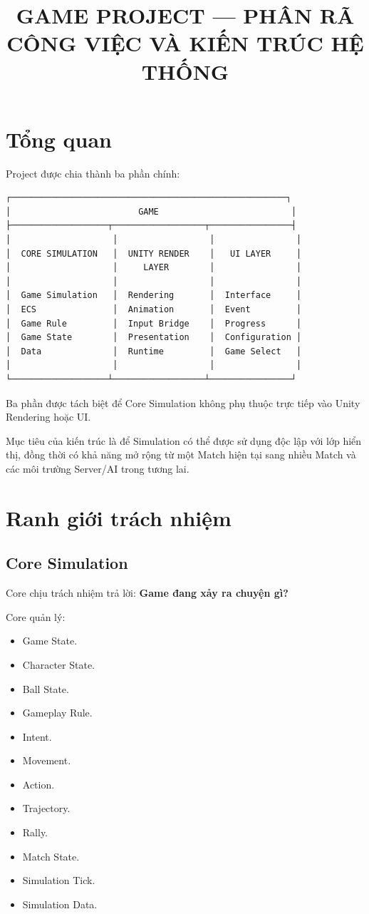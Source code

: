 \documentclass[12pt,a4paper]{article}
\title{\bfseries GAME PROJECT --- PHÂN RÃ CÔNG VIỆC VÀ KIẾN TRÚC HỆ THỐNG}
\author{}
\date{}
\begin{document}
\maketitle
\tableofcontents
\newpage

\section{Tổng quan}

Project được chia thành ba phần chính:

\begin{verbatim}
┌──────────────────────────────────────────────────────┐
│                         GAME                          │
├───────────────────┬──────────────────┬────────────────┤
│                    │                  │                │
│  CORE SIMULATION   │  UNITY RENDER    │   UI LAYER     │
│                    │     LAYER        │                │
│                    │                  │                │
│  Game Simulation   │  Rendering       │  Interface     │
│  ECS               │  Animation       │  Event         │
│  Game Rule         │  Input Bridge    │  Progress      │
│  Game State        │  Presentation    │  Configuration │
│  Data              │  Runtime         │  Game Select   │
│                    │                  │                │
└───────────────────┴──────────────────┴────────────────┘
\end{verbatim}

Ba phần được tách biệt để Core Simulation không phụ thuộc trực tiếp vào Unity Rendering hoặc UI.

Mục tiêu của kiến trúc là để Simulation có thể được sử dụng độc lập với lớp hiển thị, đồng thời có khả năng mở rộng từ một Match hiện tại sang nhiều Match và các môi trường Server/AI trong tương lai.

\section{Ranh giới trách nhiệm}

\subsection*{Core Simulation}

Core chịu trách nhiệm trả lời: \textbf{Game đang xảy ra chuyện gì?}

Core quản lý:
\begin{itemize}[nosep]
  \item Game State.
  \item Character State.
  \item Ball State.
  \item Gameplay Rule.
  \item Intent.
  \item Movement.
  \item Action.
  \item Trajectory.
  \item Rally.
  \item Match State.
  \item Simulation Tick.
  \item Simulation Data.
\end{itemize}
\end{document}
